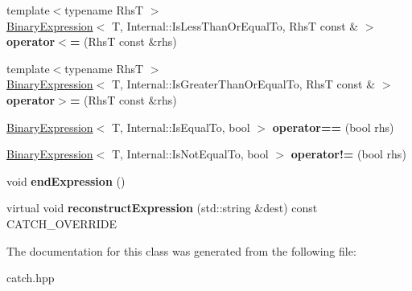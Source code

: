 \begin{DoxyCompactItemize}
\item 
\mbox{\label{classCatch_1_1ExpressionLhs_a1d10974a581c67cc400cd6cdd36b0000}} 
{\footnotesize template$<$typename RhsT $>$ }\\\hyperlink{classCatch_1_1BinaryExpression}{Binary\+Expression}$<$ T, Internal\+::\+Is\+Less\+Than\+Or\+Equal\+To, RhsT const  \& $>$ {\bfseries operator$<$=} (RhsT const \&rhs)
\item 
\mbox{\label{classCatch_1_1ExpressionLhs_a3387a494cb6b699a6c0162c79f7f533c}} 
{\footnotesize template$<$typename RhsT $>$ }\\\hyperlink{classCatch_1_1BinaryExpression}{Binary\+Expression}$<$ T, Internal\+::\+Is\+Greater\+Than\+Or\+Equal\+To, RhsT const  \& $>$ {\bfseries operator$>$=} (RhsT const \&rhs)
\item 
\mbox{\label{classCatch_1_1ExpressionLhs_ab803185079504a65b0af95f7c9669351}} 
\hyperlink{classCatch_1_1BinaryExpression}{Binary\+Expression}$<$ T, Internal\+::\+Is\+Equal\+To, bool $>$ {\bfseries operator==} (bool rhs)
\item 
\mbox{\label{classCatch_1_1ExpressionLhs_a1f3ff934880623f12a4cbd9725397ccf}} 
\hyperlink{classCatch_1_1BinaryExpression}{Binary\+Expression}$<$ T, Internal\+::\+Is\+Not\+Equal\+To, bool $>$ {\bfseries operator!=} (bool rhs)
\item 
\mbox{\label{classCatch_1_1ExpressionLhs_a13d2551a927790284fb5ddf1ee2c9079}} 
void {\bfseries end\+Expression} ()
\item 
\mbox{\label{classCatch_1_1ExpressionLhs_a7684a053e8e88a4be475a536252630da}} 
virtual void {\bfseries reconstruct\+Expression} (std\+::string \&dest) const C\+A\+T\+C\+H\+\_\+\+O\+V\+E\+R\+R\+I\+DE
\end{DoxyCompactItemize}


The documentation for this class was generated from the following file\+:\begin{DoxyCompactItemize}
\item 
catch.\+hpp\end{DoxyCompactItemize}

